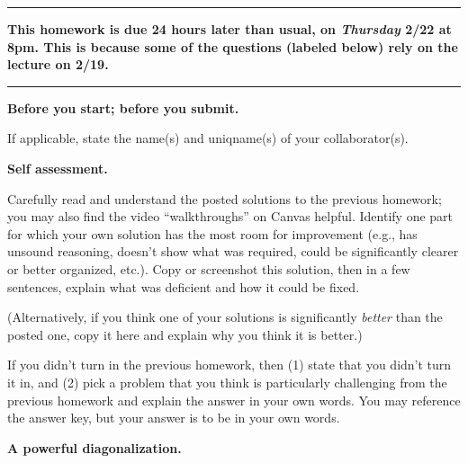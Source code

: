 \documentclass[11pt,addpoints]{exam}
\begin{document}
\hrule
\medskip

\noindent \textbf{This homework is due 24 hours later than usual, on \emph{Thursday} 2/22 at 8pm.
  This is because some of the questions (labeled below) rely on the lecture on 2/19.}
\medskip
\hrule

\medskip

\hwpreface

\pointsinmargin
{}
\marginpointname{ \points}
\marginbonuspointname{ \bonuspoints}

\begin{questions}
  \addtocounter{question}{-1}
  \question[0] \textbf{Before you start; before you submit.}
  
  If applicable, state the name(s) and uniqname(s) of your collaborator(s).

  \begin{solution}

  \end{solution}

  \question[10] \textbf{Self assessment.}
  
  Carefully read and understand the posted solutions to the previous homework; you may also find the video ``walkthroughs'' on Canvas helpful.
  Identify one part for which your own solution has the most room for improvement (e.g., has unsound reasoning, doesn’t show what was required, could be significantly clearer or better organized, etc.).
  Copy or screenshot this solution, then in a few sentences, explain what was deficient and how it could be fixed.

  (Alternatively, if you think one of your solutions is significantly \emph{better} than the posted one, copy it here and explain why you think it is better.)

  If you didn't turn in the previous homework, then (1) state that you didn't turn it in, and (2) pick a problem that you think is particularly challenging from the previous homework and explain the answer in your own words. You may reference the answer key, but your answer is to be in your own words.

  \begin{solution}
    
  \end{solution}

  \question \textbf{A powerful diagonalization.}

  \begin{parts}


\end{parts}
\end{questions}
\end{document}
